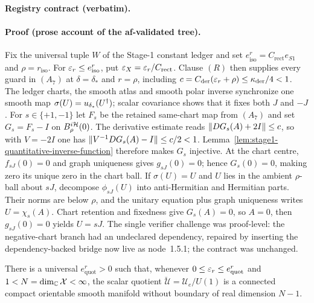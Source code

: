 \noindent\textbf{Registry contract (verbatim).}

\paragraph{Proof (prose account of the af-validated tree).}
Fix the universal tuple $W$ of the Stage-1 constant ledger and set
$e^{r}_{\mathrm{iso}}=C_{\mathrm{rect}}e_{S1}$ and $\rho=r_{\mathrm{iso}}$.
For $\varepsilon_r\le e^{r}_{\mathrm{iso}}$, put $\varepsilon_X=\varepsilon_r/C_{\mathrm{rect}}$.
Clause $(R)$ then supplies every guard in $(A_7)$ at $\delta=\delta_*$ and $r=\rho$,
including $c=C_{\mathrm{der}}(\varepsilon_r+\rho)\le\kappa_{\mathrm{der}}/4<1$.
The ledger charts, the smooth atlas and smooth polar inverse synchronize one smooth map
$\sigma(U)=u_{\delta_*}(U^{\dagger})$; scalar covariance shows that it fixes both $J$ and $-J$.
For $s\in\{+1,-1\}$ let $F_s$ be the retained same-chart map from $(A_7)$ and set
$G_s=F_s-I$ on $B^{i\mathcal H}_{\rho}(0)$.  The derivative estimate reads
$\lVert DG_s(A)+2I\rVert\le c$, so with $V=-2I$ one has
$\lVert V^{-1}DG_s(A)-I\rVert\le c/2<1$.
Lemma~\ref{lem:stage1-quantitative-inverse-function} therefore makes $G_s$ injective.
At the chart centre, $f_{sJ}(0)=0$ and graph uniqueness gives $g_{sJ}(0)=0$;
hence $G_s(0)=0$, making zero its unique zero in the chart ball.
If $\sigma(U)=U$ and $U$ lies in the ambient $\rho$-ball about $sJ$, decompose
$\phi_{sJ}(U)$ into anti-Hermitian and Hermitian parts.  Their norms are below $\rho$,
and the unitary equation plus graph uniqueness writes $U=\chi_s(A)$.
Chart retention and fixedness give $G_s(A)=0$, so $A=0$, then $g_{sJ}(0)=0$ yields
$U=sJ$.  The single verifier challenge was proof-level: the negative-chart branch had
an undeclared dependency, repaired by inserting the dependency-backed bridge now live
as node~1.5.1; the contract was unchanged.

\begin{lemma}\label{lem:stage1-quotient-manifold-package}
There is a universal $e^{r}_{\mathrm{quot}}>0$ such that, whenever
$0\le\varepsilon_r\le e^{r}_{\mathrm{quot}}$ and
$1<N=\dim_{\mathbb C}\mathcal X<\infty$, the scalar quotient
$\breve{\mathcal U}=\mathcal U_e/U(1)$ is a connected compact orientable smooth
manifold without boundary of real dimension $N-1$.
\end{lemma}

